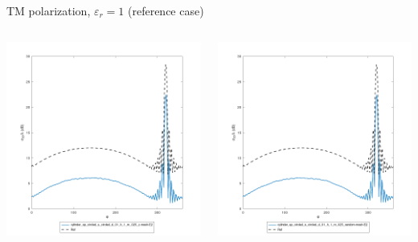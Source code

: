 \begin{frame}{TM polarization, $\varepsilon_r=1$ (reference case)}
\begin{columns}

\includegraphics[width=\linewidth]{results/FF/cylD_01_H_1_M_025_Z/iiee.png}


\includegraphics[width=\linewidth]{results/FF/cylD_01_H_1_M_025_RANDOM/iiee.png}


\end{columns}
\end{frame}

